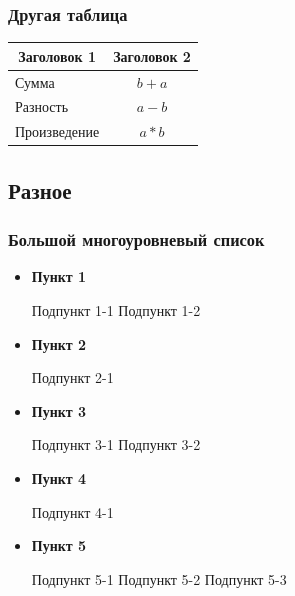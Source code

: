 \begin{frame}
    \frametitle{Другая таблица}
    \centering
    \begin{tabular}{lc}
        \toprule
        \multicolumn{1}{c}{\textbf{Заголовок 1}} & \textbf{Заголовок 2} \\ \midrule
        Сумма                                    & \(b+a\)              \\
        Разность                                 & \(a-b\)              \\
        Произведение                             & \(a*b\)              \\
        \bottomrule
    \end{tabular}
\end{frame}


\subsection{Разное}

\begin{frame}
    \frametitle{Большой многоуровневый список}
    \begin{itemize}[beginpenalty=10000, midpenalty=10000, wide=\parindent, leftmargin=0pt]
        \item \textbf{Пункт 1}
              \begin{itemize}[beginpenalty=10000, midpenalty=10000, wide=\parindent, leftmargin=0pt]
                  \itemi Подпункт 1-1
                  \itemi Подпункт 1-2
              \end{itemize}
        \item \textbf{Пункт 2}
              \begin{itemize}[beginpenalty=10000, midpenalty=10000, wide=\parindent, leftmargin=0pt]
                  \itemi Подпункт 2-1
              \end{itemize}
        \item \textbf{Пункт 3}
              \begin{itemize}[beginpenalty=10000, midpenalty=10000, wide=\parindent, leftmargin=0pt]
                  \itemi Подпункт 3-1
                  \itemi Подпункт 3-2
              \end{itemize}
        \item \textbf{Пункт 4}
              \begin{itemize}[beginpenalty=10000, midpenalty=10000, wide=\parindent, leftmargin=0pt]
                  \itemi Подпункт 4-1
              \end{itemize}
        \item \textbf{Пункт 5}
              \begin{itemize}[beginpenalty=10000, midpenalty=10000, wide=\parindent, leftmargin=0pt]
                  \itemi Подпункт 5-1
                  \itemi Подпункт 5-2
                  \itemi Подпункт 5-3
              \end{itemize}
    \end{itemize}
\end{frame}

